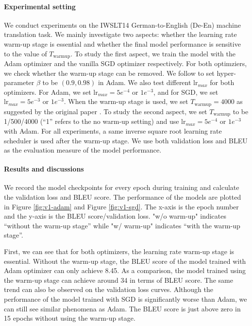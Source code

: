 \documentclass{article}
\begin{document}
\paragraph{Experimental setting} 
We conduct experiments on the IWSLT14 German-to-English (De-En) machine translation task. We mainly investigate two aspects: whether the learning rate warm-up stage is essential and whether the final model performance is sensitive to the value of $T_{\text{warmup}}$. To study the first aspect, we train the model with the Adam optimizer \citep{kingma2014adam} and the vanilla SGD optimizer \citep{ruder2016overview} respectively. For both optimziers, we check whether the warm-up stage can be removed. We follow \citet{vaswani2017attention} to set hyper-parameter $\beta$ to be $(0.9,0.98)$ in Adam. We also test different $\text{lr}_{max}$ for both optimizers. For Adam, we set $\text{lr}_{max}=5e^{-4}$ or $1e^{-3}$, and for SGD, we set $\text{lr}_{max}=5e^{-3}$ or $1e^{-3}$. When the warm-up stage is used, we set $T_{\text{warmup}}=4000$ as suggested by the original paper \citep{vaswani2017attention}. To study the second aspect, we set $T_{\text{warmup}}$ to be 1/500/4000 (``1'' refers to the no warm-up setting) and use $\text{lr}_{max}=5e^{-4}$ or $1e^{-3}$ with Adam. For all experiments, a same inverse square root learning rate scheduler is used after the warm-up stage. We use both validation loss and BLEU \citep{papineni2002bleu} as the evaluation measure of the model performance.

\paragraph{Results and discussions} We record the model checkpoints for every epoch during training and calculate the validation loss and BLEU score. The performance of the models are plotted in Figure \ref{fig:v1-adam} and Figure \ref{fig:v1-sgd}. The x-axis is the epoch number and the y-axis is the BLEU score/validation loss. "w/o warm-up" indicates ``without the warm-up stage'' while "w/ warm-up" indicates ``with the warm-up stage''.

First, we can see that for both optimizers, the learning rate warm-up stage is essential. Without the warm-up stage, the BLEU score of the model trained with Adam optimizer can only achieve 8.45. As a comparison, the model trained using the warm-up stage can achieve around 34 in terms of BLEU score. The same trend can also be observed on the validation loss curves. Although the performance of the model trained with SGD is significantly worse than Adam, we can still see similar phenomena as Adam. The BLEU score is just above zero in 15 epochs without using the warm-up stage. 
\end{document}
